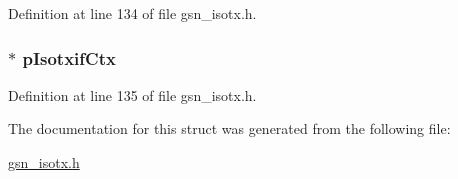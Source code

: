 Definition at line 134 of file gsn\_\-isotx.h.

\hypertarget{a00104_afffdfa8aef1548f076e03123267d83d6}{
\subsubsection[{pIsotxifCtx}]{$\ast$ {\bf pIsotxifCtx}}}
\label{a00104_afffdfa8aef1548f076e03123267d83d6}


Definition at line 135 of file gsn\_\-isotx.h.



The documentation for this struct was generated from the following file:\begin{DoxyCompactItemize}
\item 
\hyperlink{a00520}{gsn\_\-isotx.h}\end{DoxyCompactItemize}
